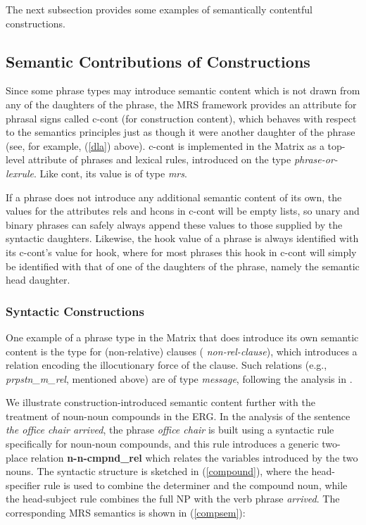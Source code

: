 \documentclass[12pt]{article}
\begin{document}
{The next subsection provides some examples of semantically
contentful constructions.

\subsection{Semantic Contributions of Constructions}
\label{ccontsec}

Since some phrase types may introduce semantic content which is not
drawn from any of the daughters of the phrase, the MRS framework
provides an attribute for phrasal signs called {\sc c-cont} (for
construction content), which behaves with respect to the semantics
principles just as though it were another daughter of the phrase (see,
for example, (\ref{dla}) above).  {\sc c-cont} is implemented in the
Matrix as a top-level attribute of phrases and lexical rules,
introduced on the type {\it phrase-or-lexrule}.  Like {\sc cont}, its
value is of type {\it mrs}.  

If a phrase does not introduce any additional semantic content of its
own, the values for the attributes {\sc rels} and {\sc hcons} in {\sc
c-cont} will be empty lists, so unary and binary phrases can safely
always append these values to those supplied by the syntactic
daughters.  Likewise, the {\sc hook} value of a phrase is always
identified with its {\sc c-cont}'s value for {\sc hook}, where for
most phrases this {\sc hook} in {\sc c-cont} will simply be identified
with that of one of the daughters of the phrase, namely the semantic
head daughter.

\subsubsection{Syntactic Constructions}

One example of a phrase type in the Matrix that does introduce its own
semantic content is the type for (non-relative) clauses ({\it
non-rel-clause}), which introduces a relation encoding the
illocutionary force of the clause.  Such relations (e.g., {\it
prpstn\_m\_rel}, mentioned above) are of type {\it message}, following the
analysis in \cite{Gin:Sag:00}.

We illustrate construction-introduced semantic content further with
the treatment of noun-noun compounds in the ERG.  In the analysis of the sentence {\it the office chair
arrived}, the phrase {\it office chair} is built using a syntactic
rule specifically for noun-noun compounds, and this rule introduces a
generic two-place relation {\bf n-n-cmpnd\_rel} which relates the variables
introduced by the two nouns.  The syntactic structure is sketched in
(\ref{compound}), where the head-specifier rule is used to combine the
determiner and the compound noun, while the head-subject rule combines
the full NP with the verb phrase {\it arrived}.  The corresponding MRS
semantics is shown in (\ref{compsem}):

}
\end{document}
